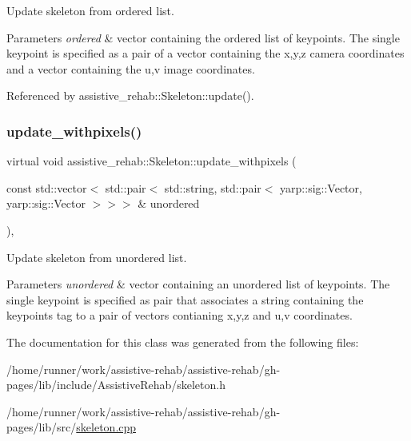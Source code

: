 Update skeleton from ordered list. 


\begin{DoxyParams}{Parameters}
{\em ordered} & vector containing the ordered list of keypoints. The single keypoint is specified as a pair of a vector containing the x,y,z camera coordinates and a vector containing the u,v image coordinates. \\
\hline
\end{DoxyParams}


Referenced by assistive\+\_\+rehab\+::\+Skeleton\+::update().

\mbox{\label{classassistive__rehab_1_1Skeleton_a36e9dfd4910120025e40ccc3d03c0e01}} 
\subsubsection{\texorpdfstring{update\+\_\+withpixels()}{update\_withpixels()}\hspace{0.1cm}{\footnotesize\ttfamily [2/2]}}
{\footnotesize\ttfamily virtual void assistive\+\_\+rehab\+::\+Skeleton\+::update\+\_\+withpixels (\begin{DoxyParamCaption}\item[{const std\+::vector$<$ std\+::pair$<$ std\+::string, std\+::pair$<$ yarp\+::sig\+::\+Vector, yarp\+::sig\+::\+Vector $>$$>$$>$ \&}]{unordered }\end{DoxyParamCaption})\hspace{0.3cm}{\ttfamily [virtual]}, {\ttfamily [inherited]}}



Update skeleton from unordered list. 


\begin{DoxyParams}{Parameters}
{\em unordered} & vector containing an unordered list of keypoints. The single keypoint is specified as pair that associates a string containing the keypoint\textquotesingle{}s tag to a pair of vectors contianing x,y,z and u,v coordinates. \\
\hline
\end{DoxyParams}


The documentation for this class was generated from the following files\+:\begin{DoxyCompactItemize}
\item 
/home/runner/work/assistive-\/rehab/assistive-\/rehab/gh-\/pages/lib/include/\+Assistive\+Rehab/skeleton.\+h\item 
/home/runner/work/assistive-\/rehab/assistive-\/rehab/gh-\/pages/lib/src/\hyperlink{skeleton_8cpp}{skeleton.\+cpp}\end{DoxyCompactItemize}
